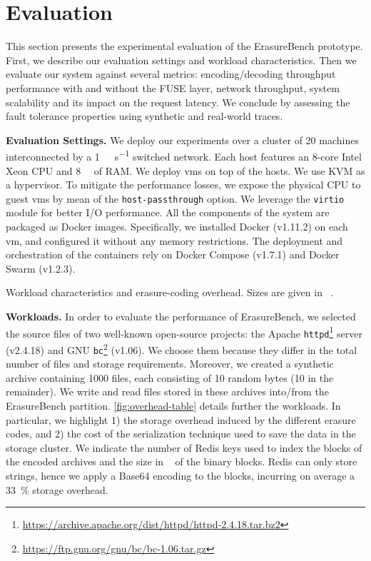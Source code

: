 \section{Evaluation}
\label{sec:evaluation}
This section presents the experimental evaluation of the ErasureBench prototype. 
First, we describe our evaluation settings and workload characteristics.  %
Then we evaluate our system against several metrics: encoding/decoding throughput performance with and without the FUSE layer, network throughput, system scalability and its impact on the request latency.
We conclude by assessing the fault tolerance properties using synthetic and real-world traces.

\textbf{Evaluation Settings.}
We deploy our experiments over a cluster of \num{20} machines interconnected by a \SI{1}{\giga\bit\per\second} switched network.
Each host features an 8-core Intel Xeon CPU and \SI{8}{\giga\byte} of RAM.
We deploy \acp{vm} on top of the hosts.
We use KVM as a hypervisor.
To mitigate the performance losses, we expose the physical CPU to guest \acp{vm} by mean of the \texttt{host-passthrough} option.
We leverage the \texttt{virtio} module for better I/O performance.
All the components of the system are packaged as Docker images.
Specifically, we installed Docker (v1.11.2) on each \ac{vm}, and configured it without any memory restrictions.
The deployment and orchestration of the containers rely on Docker Compose (v1.7.1) and Docker Swarm (v1.2.3).

\begin{table}[t]
    \centering
    \caption{Workload characteristics and erasure-coding overhead. Sizes are given in \si{\mega\byte}.}
    
    \label{fig:overhead-table}
\end{table}

\textbf{Workloads.}
In order to evaluate the performance of ErasureBench, we selected the source files of two well-known open-source projects: the Apache \texttt{httpd}\footnote{\url{https://archive.apache.org/dist/httpd/httpd-2.4.18.tar.bz2}} server (v2.4.18) and GNU \texttt{bc}\footnote{\url{https://ftp.gnu.org/gnu/bc/bc-1.06.tar.gz}} (v1.06). 
We choose them because they differ in the total number of files and storage requirements.
Moreover, we created a synthetic archive containing 1000 files, each consisting of 10 random bytes (\SI{10}{\byte} in the remainder).
We write and read files stored in these archives into/from the ErasureBench partition. 
\autoref{fig:overhead-table} details further the workloads.
In particular, we highlight 1) the storage overhead induced by the different erasure codes, and 2) the cost of the serialization technique used to save the data in the storage cluster.
We indicate the number of Redis keys used to index the blocks of the encoded archives and the size in \si{\mega\byte} of the binary blocks. 
Redis can only store strings, hence we apply a Base64 encoding to the blocks, incurring on average a \SI{33}{\percent} storage overhead.

